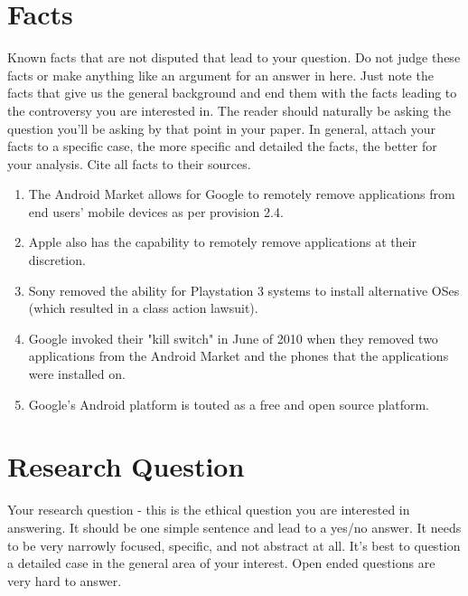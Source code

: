 \documentclass[12pt]{article}
\begin{document}
\thispagestyle{empty} %
\newpage



\section{Facts}
Known facts that are not disputed that lead to your question. Do not judge these facts or make anything like an argument for an answer in here. Just note the facts that give us the general background and end them with the facts leading to the controversy you are interested in. The reader should naturally be asking the question you'll be asking by that point in your paper. In general, attach your facts to a specific case, the more specific and detailed the facts, the better for your analysis. Cite all facts to their sources. \cite{handout}
\begin{enumerate}
\item The Android Market allows for Google to remotely remove applications from end users' mobile devices as per provision 2.4. \cite{AndroidMarketTOS}
\item Apple also has the capability to remotely remove applications at their discretion. \cite{iPhoneKill}
\item Sony removed the ability for Playstation 3 systems to install alternative OSes (which resulted in a class action lawsuit). \cite{sonyLawsuit}
\item Google invoked their "kill switch" in June of 2010 when they removed two applications from the Android Market and the phones that the applications were installed on. \cite{AndroidBlog}
\item Google's Android platform is touted as a free and open source platform. \cite{androidOpen}
\end{enumerate}

\section{Research Question}
Your research question - this is the ethical question you are interested in answering. It should be one simple sentence and lead to a yes/no answer. It needs to be very narrowly focused, specific, and not abstract at all. It's best to question a detailed case in the general area of your interest. Open ended questions are very hard to answer. \cite{handout}
\end{document}
